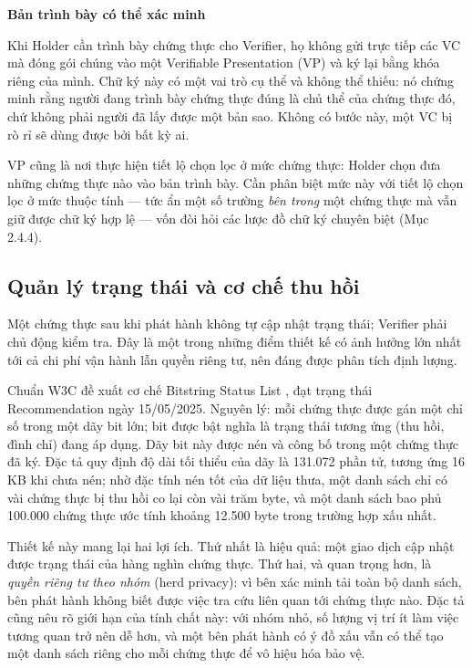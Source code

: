 \noindent \textbf{Bản trình bày có thể xác minh}

Khi Holder cần trình bày chứng thực cho Verifier, họ không gửi trực tiếp các VC mà đóng gói chúng vào một Verifiable Presentation (VP) và ký lại bằng khóa riêng của mình. Chữ ký này có một vai trò cụ thể và không thể thiếu: nó chứng minh rằng người đang trình bày chứng thực đúng là chủ thể của chứng thực đó, chứ không phải người đã lấy được một bản sao. Không có bước này, một VC bị rò rỉ sẽ dùng được bởi bất kỳ ai.

VP cũng là nơi thực hiện tiết lộ chọn lọc ở mức chứng thực: Holder chọn đưa những chứng thực nào vào bản trình bày. Cần phân biệt mức này với tiết lộ chọn lọc ở mức thuộc tính --- tức ẩn một số trường \emph{bên trong} một chứng thực mà vẫn giữ được chữ ký hợp lệ --- vốn đòi hỏi các lược đồ chữ ký chuyên biệt (Mục 2.4.4).

\subsection{Quản lý trạng thái và cơ chế thu hồi}

Một chứng thực sau khi phát hành không tự cập nhật trạng thái; Verifier phải chủ động kiểm tra. Đây là một trong những điểm thiết kế có ảnh hưởng lớn nhất tới cả chi phí vận hành lẫn quyền riêng tư, nên đáng được phân tích định lượng.

Chuẩn W3C đề xuất cơ chế Bitstring Status List \cite{W3C_BitstringStatusList2025}, đạt trạng thái Recommendation ngày 15/05/2025. Nguyên lý: mỗi chứng thực được gán một chỉ số trong một dãy bit lớn; bit được bật nghĩa là trạng thái tương ứng (thu hồi, đình chỉ) đang áp dụng. Dãy bit này được nén và công bố trong một chứng thực đã ký. Đặc tả quy định độ dài tối thiểu của dãy là 131.072 phần tử, tương ứng 16 KB khi chưa nén; nhờ đặc tính nén tốt của dữ liệu thưa, một danh sách chỉ có vài chứng thực bị thu hồi co lại còn vài trăm byte, và một danh sách bao phủ 100.000 chứng thực ước tính khoảng 12.500 byte trong trường hợp xấu nhất.

Thiết kế này mang lại hai lợi ích. Thứ nhất là hiệu quả: một giao dịch cập nhật được trạng thái của hàng nghìn chứng thực. Thứ hai, và quan trọng hơn, là \emph{quyền riêng tư theo nhóm} (herd privacy): vì bên xác minh tải toàn bộ danh sách, bên phát hành không biết được việc tra cứu liên quan tới chứng thực nào. Đặc tả cũng nêu rõ giới hạn của tính chất này: với nhóm nhỏ, số lượng vị trí ít làm việc tương quan trở nên dễ hơn, và một bên phát hành có ý đồ xấu vẫn có thể tạo một danh sách riêng cho mỗi chứng thực để vô hiệu hóa bảo vệ.

